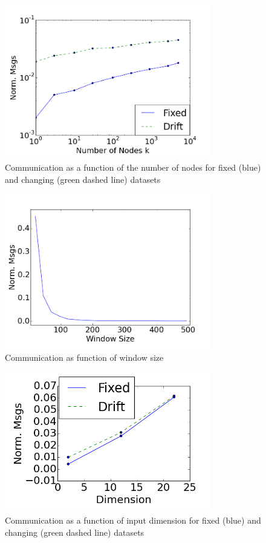 \begin{figure}[]
\centering
    \centering
  \includegraphics[width=90mm]{graphics/LDA/Nodes.png}
  \caption{Communication as a function of the number of nodes for fixed (blue)
  and changing (green dashed line) datasets}\label{Nodes}
  \end{figure}
 \begin{figure}[]
\centering
  \includegraphics[width=90mm]{graphics/LDA/WindowSize.png}
  \caption{Communication as function of window size }\label{WindowSize}
  \end{figure}
  
  \begin{figure}[]
\centering
  \includegraphics[width=90mm]{graphics/LDA/Dimension.png}
  \caption{Communication as a function of input dimension for fixed (blue) and
  changing (green  dashed line) datasets}\label{Dimension}
\end{figure}

